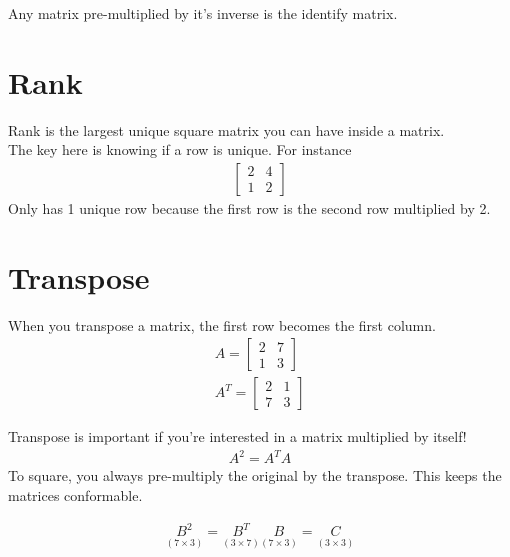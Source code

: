 \documentclass{article}
\begin{document}
Any matrix pre-multiplied by it's inverse is the identify matrix. 

\section{Rank}
Rank is the largest unique square matrix you can have inside a matrix.\\

The key here is knowing if a row is unique.  For instance 
\begin{align}
    \begin{bmatrix}
        2 & 4 \\
        1 & 2
    \end{bmatrix}
\end{align}
Only has 1 unique row because the first row is the second row multiplied by 2. 

\section{Transpose}
When you transpose a matrix, the first row becomes the first column. 
\begin{align}
    A = \begin{bmatrix}
        2 & 7 \\
        1 & 3
    \end{bmatrix}\\
    A^{T} = \begin{bmatrix}
        2 & 1 \\
        7 & 3
    \end{bmatrix}
\end{align}

Transpose is important if you're interested in a matrix multiplied by itself! 
\begin{align}
    A^2 = A^{T}A 
\end{align}
To square, you always pre-multiply the original by the transpose. This keeps the matrices conformable. 

\begin{align}
    \underset{(7 \times 3)}{B^2} = \underset{(3 \times 7)}{B^T} \underset{(7 \times 3)}{B} = \underset{ (3 \times 3)}{C}
\end{align}
\end{document}
